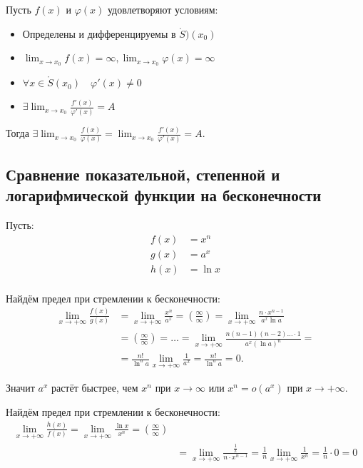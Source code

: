 \begin{theorem}
  Пусть $f(x)$ и  $\varphi(x)$ удовлетворяют условиям:
  \begin{itemize}
    \item Определены и дифференцируемы в $\mathring{S})(x_0)$
    \item $\lim_{x \to x_0} f(x) = \infty, \lim_{x \to x_0} \varphi(x) = \infty$
    \item $\forall x \in \mathring{S}(x_0) \quad \varphi'(x) \neq 0$
    \item $\exists \lim_{x \to x_0} \frac{f'(x)}{\varphi'(x)} = A$
  \end{itemize}
  Тогда $\exists \lim_{x \to x_0} \frac{f(x)}{\varphi(x)} = \lim_{x \to x_0} \frac{f'(x)}{\varphi'(x)} = A$.
\end{theorem}

\subsection{Сравнение показательной, степенной и логарифмической функции на бесконечности}

Пусть:
\begin{align*}
  f(x) &= x^n \\
  g(x) &= a^x \\
  h(x) &= \ln x \\
\end{align*}

Найдём предел при стремлении к бесконечности:
\begin{align*}
  \lim_{x \to +\infty} \frac{f(x)}{g(x)} &= \lim_{x \to +\infty} \frac{x^n}{a^x} = \left( \frac{\infty}{\infty} \right) = \lim_{x \to +\infty} \frac{n \cdot x ^ {n-1}}{a^x \ln a} \\
                                  &= \left( \frac{\infty}{\infty} \right) = \ldots = \lim_{x \to +\infty} \frac{n(n-1)(n-2)\ldots \cdot 1}{a^x(\ln a)^n} = \\
                                  &= \frac{n!}{\ln^n a} \lim_{x \to +\infty} \frac{1}{a^x} = \frac{n!}{\ln^n a} = 0.
\end{align*}

Значит $a^x$ растёт быстрее, чем  $x^n$ при $x \to \infty$ или $x^n = o(a^x)$ при $x \to +\infty$.

Найдём предел при стремлении к бесконечности:
\begin{align*}
  \lim_{x \to +\infty} \frac{h(x)}{f(x)} = \lim_{x \to +\infty} \frac{\ln x}{x^n} = \left( \frac{\infty}{\infty} \right) \\
  &= \lim_{x \to +\infty}  \frac{\frac{1}{x}}{n \cdot x^{n-1}} = \frac{1}{n} \lim_{x \to +\infty} \frac{1}{x^n} = \frac{1}{n} \cdot 0 = 0
\end{align*}

